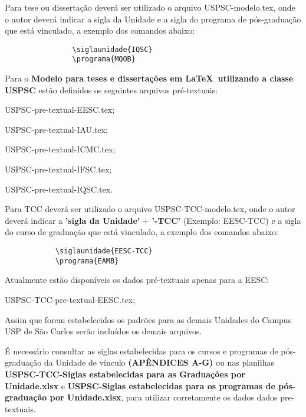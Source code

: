		
Para tese ou dissertação deverá ser utilizado o arquivo USPSC-modelo.tex, onde o autor deverá indicar a sigla da Unidade e a sigla do programa de pós-graduação que está vinculado, a exemplo dos comandos abaixo:
		
			\begin{verbatim}
				\siglaunidade{IQSC}
				\programa{MQOB}
			\end{verbatim}
			
Para o \textbf{Modelo para teses e dissertações em \LaTeX\ utilizando a classe USPSC} estão definidos os seguintes arquivos pré-textuais:
			
			\begin{alineas}	 
				\item USPSC-pre-textual-EESC.tex;
				\item USPSC-pre-textual-IAU.tex;
				\item USPSC-pre-textual-ICMC.tex;
				\item USPSC-pre-textual-IFSC.tex;
				\item USPSC-pre-textual-IQSC.tex.
			\end{alineas}
			
Para TCC deverá ser utilizado o arquivo USPSC-TCC-modelo.tex, onde o autor deverá indicar a \textbf{'sigla da Unidade'} + \textbf{'-TCC'} (Exemplo: EESC-TCC) e a sigla do curso de graduação que está vinculado, a exemplo dos comandos abaixo:
			
			\begin{verbatim}
			\siglaunidade{EESC-TCC}
			\programa{EAMB}
			\end{verbatim}
			
Atualmente estão disponíveis os dados pré-textuais apenas para a EESC:
			
			\begin{alineas}	 
				\item USPSC-TCC-pre-textual-EESC.tex;
			\end{alineas}
			
Assim que forem estabelecidos os padrões para as demais Unidades do Campus USP de São Carlos serão incluídos os demais arquivos.
			
			
É necessário consultar as siglas estabelecidas para os cursos e programas de pós-graduação da Unidade de vínculo \textbf{(APÊNDICES A-G)} ou nas planilhas \textbf{USPSC-TCC-Siglas estabelecidas para as Graduações por Unidade.xlsx} e \textbf{USPSC-Siglas estabelecidas para os programas de pós-graduação por Unidade.xlsx}, para utilizar corretamente os dados dados pre-textuais. 

